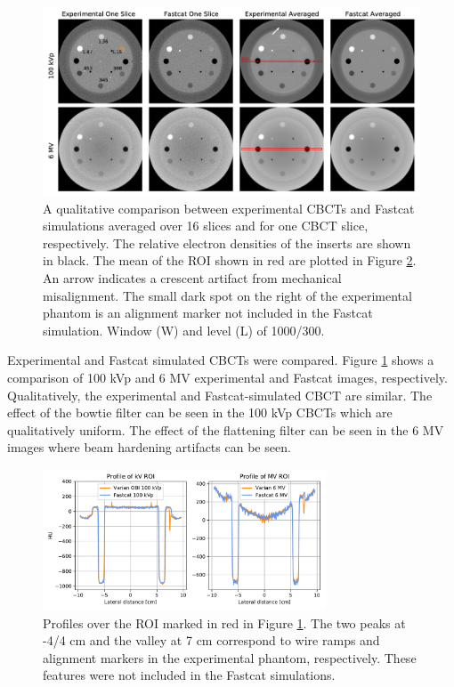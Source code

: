 \begin{figure}[ht!]
  \begin{center}
  \includegraphics[width=\textwidth, clip]{figures/all_cbcts.pdf}
  \caption{
  A qualitative comparison between experimental CBCTs and Fastcat simulations averaged over 16 slices and for one CBCT slice, respectively. The relative electron densities of the inserts are shown in black. The mean of the ROI shown in red are plotted in Figure \ref{profile}. An arrow indicates a crescent artifact from mechanical misalignment. The small dark spot on the right of the experimental phantom is an alignment marker not included in the Fastcat simulation. Window (W) and level (L) of 1000/300. 
  \label{images} 
    }  %
    \end{center}
\end{figure}

Experimental and Fastcat simulated CBCTs were compared. Figure \ref{images} shows a comparison of 100 kVp and 6 MV experimental and Fastcat images, respectively. Qualitatively, the experimental and Fastcat-simulated CBCT are similar. The effect of the bowtie filter can be seen in the 100 kVp CBCTs which are qualitatively uniform. The effect of the flattening filter can be seen in the 6 MV images where beam hardening artifacts can be seen.

\begin{figure}[ht!]
  \begin{center}
  \includegraphics[width=0.75\textwidth, clip]{figures/one_profile.pdf}
  \caption{
  Profiles over the ROI marked in red in Figure \ref{images}. The two peaks at -4/4 cm and the valley at 7 cm correspond to wire ramps and alignment markers in the experimental phantom, respectively. These features were not included in the Fastcat simulations.
  \label{profile} 
    }  %
    \end{center}
\end{figure}

